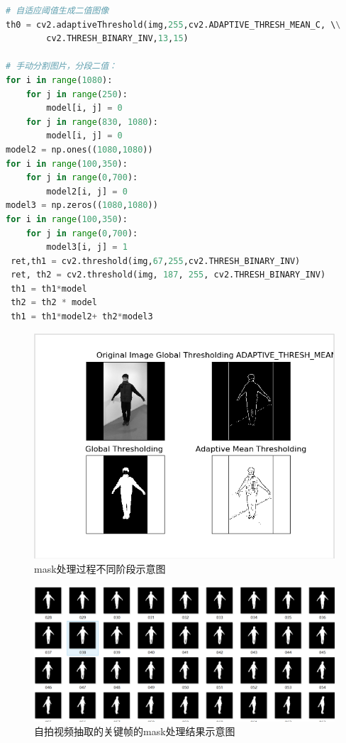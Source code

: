 \documentclass{article}
\begin{document}
\begin{enumerate}
\begin{lstlisting}[language=python]
# 自适应阈值生成二值图像
th0 = cv2.adaptiveThreshold(img,255,cv2.ADAPTIVE_THRESH_MEAN_C, \\
		cv2.THRESH_BINARY_INV,13,15)

# 手动分割图片，分段二值：
for i in range(1080):
    for j in range(250):
        model[i, j] = 0
    for j in range(830, 1080):
        model[i, j] = 0
model2 = np.ones((1080,1080))
for i in range(100,350):
    for j in range(0,700):
        model2[i, j] = 0
model3 = np.zeros((1080,1080))
for i in range(100,350):
    for j in range(0,700):
        model3[i, j] = 1
 ret,th1 = cv2.threshold(img,67,255,cv2.THRESH_BINARY_INV)
 ret, th2 = cv2.threshold(img, 187, 255, cv2.THRESH_BINARY_INV)
 th1 = th1*model
 th2 = th2 * model
 th1 = th1*model2+ th2*model3
\end{lstlisting}

\end{enumerate}


\begin{figure}[h]
	\centering
	\includegraphics[width=12cm]{figure/mask_process}
	\caption{mask处理过程不同阶段示意图}
\end{figure}

\begin{figure}
	\centering
	\includegraphics[width=16cm]{figure/mask_res}
	\caption{自拍视频抽取的关键帧的mask处理结果示意图}
\end{figure}
\end{document}
